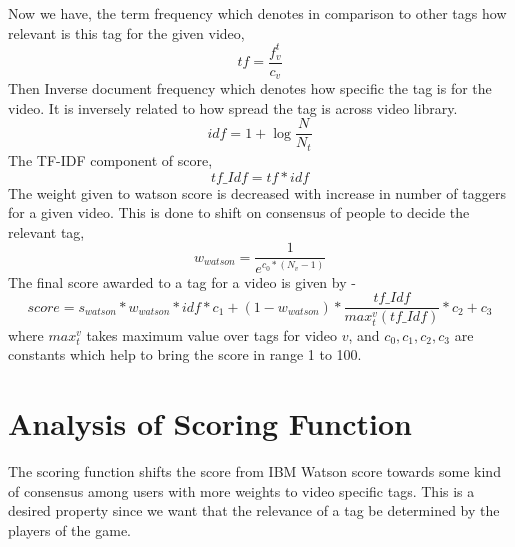 \documentclass[12pt]{report}
\begin{document}
Now we have, the term frequency which denotes in comparison to other tags how relevant is this tag for the given video,
\begin{equation}
tf = \frac{f^t_v}{c_v}
\end{equation}
Then Inverse document frequency which denotes how specific the tag is for the video. It is inversely related to how spread the tag is across video library.
\begin{equation}
idf = 1 + \log\frac{N}{N_t}
\end{equation}
The TF-IDF component of score,
\begin{equation}
tf\_Idf = tf * idf
\end{equation}
The weight given to watson score is decreased with increase in number of taggers for a given video. This is done to shift on consensus of people to decide the relevant tag,
\begin{equation}
w_{watson}=\frac{1}{e^{c_0*(N_v - 1)}}
\end{equation}
The final score awarded to a tag for a video is given by -
\begin{equation}
score = s_{watson}*w_{watson}*idf*c_1 + (1-w_{watson}) * \frac{tf\_Idf}{max_t^v(tf\_Idf)} * c_2 + c_3
\end{equation}
where $max_t^v $ takes maximum value over tags for video $v$, and $c_0, c_1, c_2, c_3$ are constants which help to bring the score in range 1 to 100.
\pagebreak

\section{Analysis of Scoring Function}
The scoring function shifts the score from IBM Watson score towards some kind of consensus among users with more weights to video specific tags. This is a desired property since we want that the relevance of a tag be determined by the players of the game.
\end{document}
